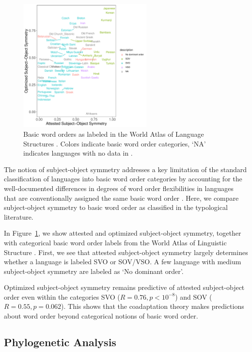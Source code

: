 \documentclass[11pt,a4paper]{article}
\begin{document}
\begin{figure}
    \centering
    \includegraphics[width=0.6\textwidth]{../analysis/categorical_order/figures/by_categorical_order.pdf}
    \caption{Basic word orders as labeled in the World Atlas of Language Structures \citep{wals-81}. Colors indicate basic word order categories, `NA' indicates languages with no data in \citep{wals-81}.}
    \label{fig:categorical-basic-order}
\end{figure}



The notion of subject-object symmetry addresses a key limitation of the standard classification of languages into basic word order categories by accounting for the well-documented differences in degrees of word order flexibilities in languages that are conventionally assigned the same basic word order \citep{steele1978word}.
Here, we compare subject-object symmetry to basic word order as classified in the typological literature.


In Figure~\ref{fig:categorical-basic-order}, we show attested and optimized subject-object symmetry, together with categorical basic word order labels from the World Atlas of Linguistic Structure \citep{wals-81}.
First, we see that attested subject-object symmetry largely determines whether a language is labeled SVO or SOV/VSO.
A few language with medium subject-object symmetry are labeled as `No dominant order'.

Optimized subject-object symmetry remains predictive of attested subject-object order even within the categories SVO ($R = 0.76, p < 10^{-8}$) and SOV ($R=0.55, p = 0.062$).
This shows that the coadaptation theory makes predictions about word order beyond categorical notions of basic word order.


\subsection{Phylogenetic Analysis}
\end{document}
